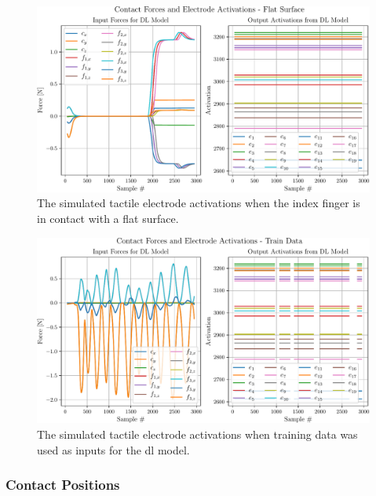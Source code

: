 \begin{figure}[!h]
	\begin{center}
		\includegraphics[width=\textwidth]{chapters/1-tactile-perception/fig/matplotlib/flat-contact-graph.pdf}
	\end{center}
	\caption{The simulated tactile electrode activations when the index finger is in contact with a flat surface.}
	\label{fig:flat-contact-graph}
\end{figure}
\begin{figure}[!h]
	\begin{center}
		\includegraphics[width=\textwidth]{chapters/1-tactile-perception/fig/matplotlib/train-contact-graph.pdf}
	\end{center}
	\caption{The simulated tactile electrode activations when training data was used as inputs for the \gls{dl} model.}
	\label{fig:train-contact-graph}
\end{figure}

\subsubsection{Contact Positions}

